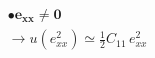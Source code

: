 \documentclass[preview]{standalone}
\begin{document}
\begin{align*}
& \boldsymbol{\bullet e_{xx} \neq 0} \\
            & \rightarrow u(e_{xx}^2) \simeq \frac{1}{2}C_{11}\,e_{xx}^2
\end{align*}
\end{document}
